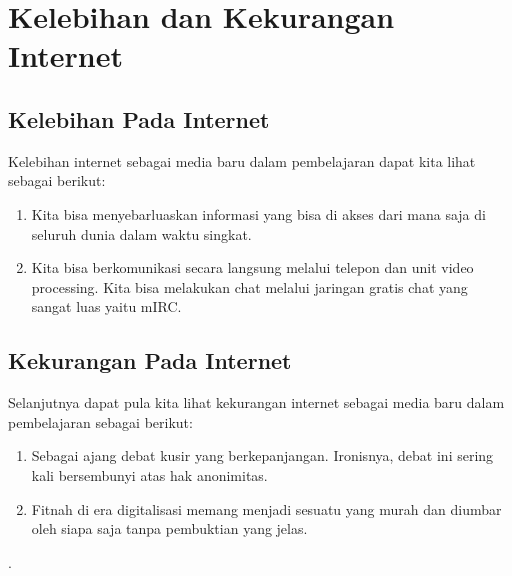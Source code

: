 \section{Kelebihan dan Kekurangan Internet}
\subsection{Kelebihan Pada Internet}
    Kelebihan internet sebagai media baru dalam pembelajaran dapat kita lihat sebagai berikut:
\begin{enumerate}
\item Kita bisa menyebarluaskan informasi yang bisa di akses dari mana saja di seluruh dunia dalam waktu singkat.
\item Kita bisa berkomunikasi secara langsung melalui telepon dan unit video processing. Kita bisa melakukan chat melalui jaringan gratis chat yang sangat luas yaitu mIRC.
\end{enumerate}
\subsection{Kekurangan Pada Internet}
    Selanjutnya dapat pula kita lihat kekurangan internet sebagai media baru dalam pembelajaran  sebagai berikut:
\begin{enumerate}
\item Sebagai ajang debat kusir yang berkepanjangan. Ironisnya, debat ini sering kali bersembunyi atas hak anonimitas.
\item Fitnah di era digitalisasi memang menjadi sesuatu yang murah dan diumbar oleh siapa saja tanpa pembuktian yang jelas.
\end{enumerate}
\cite{gafar2017penggunaan}.

